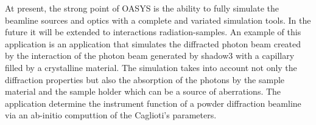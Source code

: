 \documentclass{aip-cp}
\begin{document}
At present, the strong point of OASYS is the ability to fully simulate the beamline sources and optics with a complete and variated simulation tools. In the future it will be extended to interactions radiation-samples. An example of this application is an application that simulates the diffracted photon beam created by the interaction of the photon beam generated by shadow3 with a capillary filled by a crystalline material. The simulation takes into account not only the diffraction properties but also the absorption of the photons by the sample material and the sample holder which can be a source of aberrations. The application determine the instrument function of a powder diffraction beamline via an ab-initio  computtion of the Caglioti's parameters.

%
%
\end{document}
